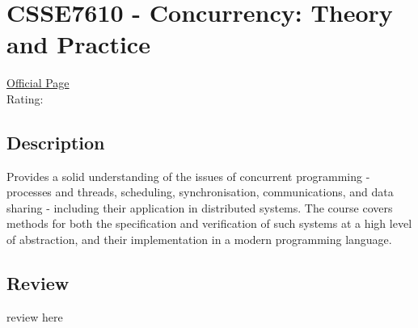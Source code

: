 \hypertarget{CSSE7610}{\section{CSSE7610 - Concurrency: Theory and Practice}}

\large
\textcolor{turbo_purple}{\href{https://my.uq.edu.au/programs-courses/course.html?course_code=CSSE7610}{Official Page}} \\
Rating: \cstar\cstar\cstar\cstar\ostar

\normalsize
\subsection*{Description}
Provides a solid understanding of the issues of concurrent programming - processes and threads, scheduling, synchronisation, communications, and data sharing - including their application in distributed systems.
The course covers methods for both the specification and verification of such systems at a high level of abstraction, and their implementation in a modern programming language.

\subsection*{Review}
review here
